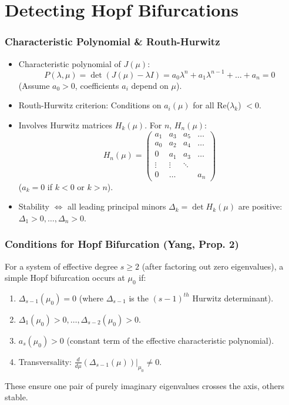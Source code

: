 \documentclass[aspectratio=169]{beamer}
\begin{document}
\section{Detecting Hopf Bifurcations}

\begin{frame}{\insertsectionhead}
	\frametitle{Characteristic Polynomial \& Routh-Hurwitz}
	\begin{itemize}
		\item Characteristic polynomial of $J(\mu)$:
			$$ P(\lambda, \mu) = \det(J(\mu) - \lambda I) = a_0\lambda^n + a_1\lambda^{n-1} + \dots + a_n = 0 $$
			(Assume $a_0 > 0$, coefficients $a_i$ depend on $\mu$).
		\item \alert{Routh-Hurwitz criterion}: Conditions on $a_i(\mu)$ for all Re($\lambda_k$) $< 0$.
		\item Involves \alert{Hurwitz matrices} $H_k(\mu)$. For $n$, $H_n(\mu)$:
			$$  H_n(\mu) =
			\begin{pmatrix}
				a_1 & a_3 & a_5 & \dots \\
				a_0 & a_2 & a_4 & \dots \\
				0 & a_1 & a_3 & \dots \\
				\vdots & \vdots & \ddots & \\
				0 & \dots & & a_n
			\end{pmatrix} $$
			($a_k = 0$ if $k<0$ or $k>n$).
		\item Stability $\iff$ all leading principal minors $\Delta_k = \det H_k(\mu)$ are positive: $\Delta_1 > 0, \dots, \Delta_n > 0$.
	\end{itemize}
\end{frame}

\begin{frame}{\insertsectionhead}
	\frametitle{Conditions for Hopf Bifurcation (Yang, Prop. 2)}
	For a system of effective degree $s \ge 2$ (after factoring out zero eigenvalues), a simple Hopf bifurcation occurs at $\mu_0$ if:
	\begin{enumerate}
		\item $\Delta_{s-1}(\mu_0) = 0$ (where $\Delta_{s-1}$ is the $(s-1)^{th}$ Hurwitz determinant).
		\item $\Delta_1(\mu_0) > 0, \dots, \Delta_{s-2}(\mu_0) > 0$.
		\item $a_s(\mu_0) > 0$ (constant term of the effective characteristic polynomial).
		\item Transversality: $\frac{d}{d\mu}(\Delta_{s-1}(\mu))\bigg|_{\mu_0} \neq 0$.
	\end{enumerate}
	These ensure one pair of purely imaginary eigenvalues crosses the axis, others stable.
\end{frame}
\end{document}
